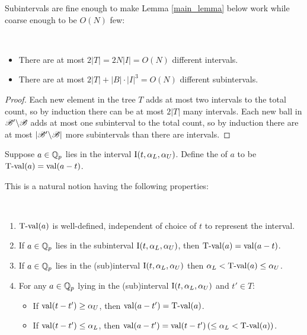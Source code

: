 

Subintervals are fine enough to make Lemma \ref{main_lemma} below work while coarse enough to be $O(N)$ few:
\begin{Lemma} \label{interval_count}\ 
  \begin{itemize}
  \item 
    There are at most $2|T| = 2 N |I| = O(N)$ different intervals.
  \item 
    There are at most $2|T| + |B| \cdot |I|^3 = O(N)$ different subintervals.
  \end{itemize}
\end{Lemma}

\begin{proof}
  Each new element in the tree $T$ adds at most two intervals to the total count,
  so by induction there can be at most $2|T|$ many intervals.
  Each new ball in $\mathscr B' \backslash \mathscr B$ adds at most one subinterval to the total count,
  so by induction there are at most $|\mathscr B' \backslash \mathscr B|$ more subintervals than there are intervals.
\end{proof}


\begin{Definition}
  Suppose $a \in \mathbb{Q}_p$ lies in the interval $\operatorname{I}(t, \alpha_L, \alpha_U)$. 
  Define the  of $a$ to be $\operatorname{T-val}(a) = \operatorname{val}(a - t)$.    
\end{Definition}

This is a natural notion having the following properties:
\begin{Lemma}  \label{tval} \ 
  \begin{enumerate}[label=(\alph*)]
  \item $\operatorname{T-val}(a)$ is well-defined, independent of choice of $t$ to represent the interval.
  \item If $a \in \mathbb{Q}_p$ lies in the subinterval $\operatorname{I}(t, \alpha_L, \alpha_U)$,
    then $\operatorname{T-val}(a) = \operatorname{val}(a - t)$.
  \item If $a \in \mathbb{Q}_p$ lies in the (sub)interval $\operatorname{I}(t, \alpha_L, \alpha_U)$ 
    then $\alpha_L < \operatorname{T-val}(a) \leq \alpha_U$.
  \item For any $a \in \mathbb{Q}_p$ lying in the (sub)interval $\operatorname{I}(t, \alpha_L, \alpha_U)$ and $t' \in T$:
    \begin{itemize}
    \item If $\operatorname{val}(t - t') \geq \alpha_U$, then $\operatorname{val}(a - t') = \operatorname{T-val}(a)$. 
    \item If $\operatorname{val}(t - t') \leq \alpha_L$, then $\operatorname{val}(a - t') = \operatorname{val}(t - t') \left(\leq \alpha_L < \operatorname{T-val}(a)\right)$. 
    \end{itemize}
  \end{enumerate}
\end{Lemma}


